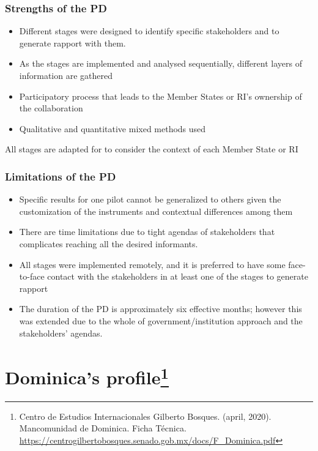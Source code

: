 \documentclass[
]{book}
\begin{document}
\hypertarget{strengths-of-the-pd}{%
\subsection*{Strengths of the PD}\label{strengths-of-the-pd}}

\begin{itemize}
\item
  Different stages were designed to identify specific stakeholders and to generate rapport with them.
\item
  As the stages are implemented and analysed sequentially, different layers of information are gathered
\item
  Participatory process that leads to the Member States or RI's ownership of the collaboration
\item
  Qualitative and quantitative mixed methods used
\end{itemize}

All stages are adapted for to consider the context of each Member State or RI

\hypertarget{limitations-of-the-pd}{%
\subsection*{Limitations of the PD}\label{limitations-of-the-pd}}

\begin{itemize}
\item
  Specific results for one pilot cannot be generalized to others given the customization of the instruments and contextual differences among them
\item
  There are time limitations due to tight agendas of stakeholders that complicates reaching all the desired informants.
\item
  All stages were implemented remotely, and it is preferred to have some face-to-face contact with the stakeholders in at least one of the stages to generate rapport
\item
  The duration of the PD is approximately six effective months; however this was extended due to the whole of government/institution approach and the stakeholders' agendas.
\end{itemize}

\hypertarget{section4}{%
\chapter[Dominica's profile]{\texorpdfstring{Dominica's profile\footnote{Centro de Estudios Internacionales Gilberto Bosques. (april, 2020). Mancomunidad de Dominica. Ficha Técnica. \url{https://centrogilbertobosques.senado.gob.mx/docs/F_Dominica.pdf}}}{Dominica's profile}}\label{section4}}
\end{document}

